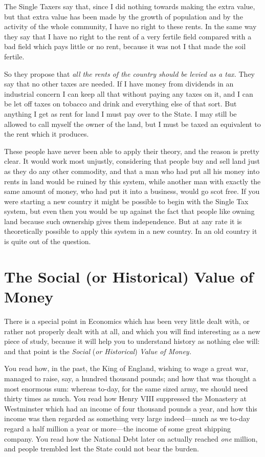 \documentclass{book}
\begin{document}
The Single Taxers say that, since I did nothing towards making the extra value, but that extra value has been made by the growth of population and by the activity of the whole community, I have no right to these rents. In the same way they say that I have no right to the rent of a very fertile field compared with a bad field which pays little or no rent, because it was not I that made the soil fertile.

So they propose that \emph{all the rents of the country should be levied as a tax.} They say that no other taxes are needed. If I have money from dividends in an industrial concern I can keep all that without paying any taxes on it, and I can be let off taxes on tobacco and drink and everything else of that sort. But anything I get as rent for land I must pay over to the State. I may still be allowed to call myself the owner of the land, but I must be taxed an equivalent to the rent which it produces.

These people have never been able to apply their theory, and the reason is pretty clear. It would work most unjustly, considering that people buy and sell land just as they do any other commodity, and that a man who had put all his money into rents in land would be ruined by this system, while another man with exactly the same amount of money, who had put it into a business, would go scot free. If you were starting a new country it might be possible to begin with the Single Tax system, but even then you would be up against the fact that people like owning land because such ownership gives them independence. But at any rate it is theoretically possible to apply this system in a new country. In an old country it is quite out of the question.

\chapter*{The Social (or Historical) Value of Money}
\label{chapter-19}
There is a special point in Economics which has been very little dealt with, or rather not properly dealt with at all, and which you will find interesting as a new piece of study, because it will help you to understand history as nothing else will: and that point is the \emph{Social} (\emph{or Historical}) \emph{Value of Money.}

You read how, in the past, the King of England, wishing to wage a great war, managed to raise, say, a hundred thousand pounds; and how that was thought a most enormous sum: whereas to-day, for the same sized army, we should need thirty times as much. You read how Henry VIII suppressed the Monastery at Westminster which had an income of four thousand pounds a year, and how this income was then regarded as something very large indeed—much as we to-day regard a half million a year or more—the income of some great shipping company. You read how the National Debt later on actually reached \emph{one} million, and people trembled lest the State could not bear the burden.
\end{document}
